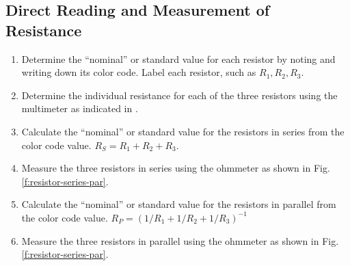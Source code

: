 \subsection{Direct Reading and Measurement of Resistance} \label{s:directmsr}
\begin{enumerate}
	\item Determine the ``nominal'' or standard value for each resistor by noting and writing down its color code. Label each resistor, such as $R_1, R_2, R_3$.
	\item \label{l:mm} Determine the individual resistance for each of the three resistors using the multimeter as indicated in .
	\item Calculate the ``nominal'' or standard value for the resistors in series from the color code value. $R_S = R_1 + R_2 + R_3$.
	\item Measure the three resistors in series using the ohmmeter as shown in Fig. \ref{f:resistor-series-par}.
	\item Calculate the ``nominal'' or standard value for the resistors in parallel from the color code value. $R_P  =  \left( 1/R_1  +  1/R_2  +  1/R_3 \right)^{-1}$
	\item Measure the three resistors in parallel using the ohmmeter as shown in Fig. \ref{f:resistor-series-par}.
\end{enumerate}
	
